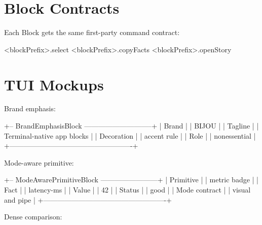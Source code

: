 \section{Block Contracts}\label{record-099-block-contracts}



Each Block gets the same first-party command contract:

\begin{CodeBlock}
<blockPrefix>.select
<blockPrefix>.copyFacts
<blockPrefix>.openStory
\end{CodeBlock}

\section{TUI Mockups}\label{record-099-tui-mockups}

Brand emphasis:

\begin{CodeBlock}
+-- BrandEmphasisBlock -----------------------------+
| Brand                                              |
|   BIJOU                                            |
| Tagline                                            |
|   Terminal-native app blocks                       |
| Decoration                                         |
|   accent rule                                      |
| Role                                               |
|   nonessential                                     |
+----------------------------------------------------+
\end{CodeBlock}

Mode-aware primitive:

\begin{CodeBlock}
+-- ModeAwarePrimitiveBlock ------------------------+
| Primitive                                          |
|   metric badge                                     |
| Fact                                               |
|   latency-ms                                       |
| Value                                              |
|   42                                               |
| Status                                             |
|   good                                             |
| Mode contract                                      |
|   visual and pipe                                  |
+----------------------------------------------------+
\end{CodeBlock}

Dense comparison:

